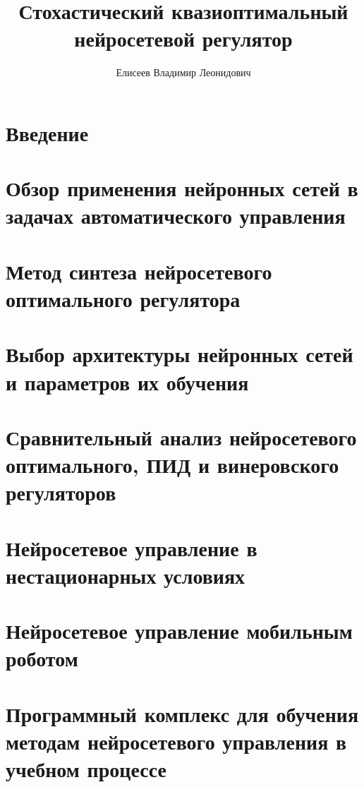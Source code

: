 \documentclass[12pt]{rusthesis}
\title{Стохастический квазиоптимальный нейросетевой регулятор}
\author{Елисеев Владимир Леонидович}
\begin{document}

\setcounter{tocdepth}{4}\tableofcontents

\chapter*{Введение}

%

\chapter{Обзор применения нейронных сетей в задачах автоматического управления}
%

\chapter{Метод синтеза нейросетевого оптимального регулятора}
%

\chapter{Выбор архитектуры нейронных сетей и параметров их обучения}
%

\chapter{Сравнительный анализ нейросетевого оптимального, ПИД и винеровского регуляторов}
%

\chapter{Нейросетевое управление в нестационарных условиях}
%

\chapter{Нейросетевое управление мобильным роботом}
%

\chapter{Программный комплекс для обучения методам нейросетевого управления в учебном процессе}

\end{document}
